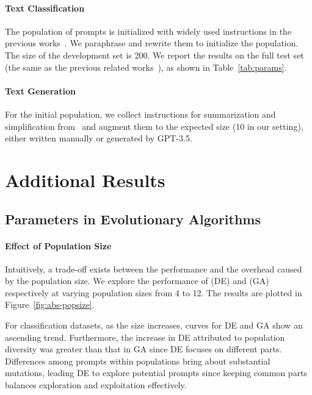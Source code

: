\paragraph{Text Classification}

The population of prompts is initialized with widely used instructions in the previous works~\citep{mishra2022cross,zhang2022opt}. We paraphrase and rewrite them to initialize the population. 
The size of the development set is 200.
We report the results on the full test set (the same as the previous related works~\citep{deng2022rlprompt, zhang2023tempera}), as shown in Table~\ref{tab:params}.

\paragraph{Text Generation}
For the initial population, we collect instructions for summarization and simplification from~\citet{li2023deliberate,sanh2021multitask,zhang2023multi} and augment them to the expected size (10 in our setting), either written manually or generated by GPT-3.5. 

\section{Additional Results}
\subsection{Parameters in Evolutionary Algorithms}
\paragraph{Effect of Population Size}
Intuitively, a trade-off exists between the performance and the overhead caused by the population size.
We explore the performance of \modelname (DE) and \modelname (GA) respectively at varying population sizes from 4 to 12. The results are plotted in Figure~\ref{fig:abs-popsize}.

For classification datasets, as the size increases, curves for DE and GA show an ascending trend. Furthermore, the increase in DE attributed to population diversity was greater than that in GA
since DE focuses on different parts. 
Differences among prompts within populations bring about substantial mutations, leading DE to explore potential prompts since keeping common parts balances exploration and exploitation effectively.

